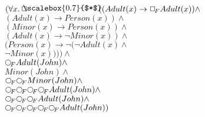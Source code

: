 \documentclass[a4paper,10pt]{article}
\begin{document}
 \newcommand{\nxt}{{\ensuremath\raisebox{0.25ex}{\text{\scriptsize$\bigcirc$}}}}
\newcommand{\Rdiamond}{\Diamond_{\!F}}
\newcommand{\Rbox}{\Box_{\!F}}
\newcommand{\Rnext}{\nxt_{\!F}}
\newcommand{\Ldiamond}{\Diamond_{\!P}}
\newcommand{\Lbox}{\Box_{\!P}}
\newcommand{\Lnext}{\nxt_{\!P}}
\newcommand{\SVdiamond}{\mathop{\ooalign{$\Diamond$ \cr \kern0.5ex
    \raisebox{0.35ex}{\scalebox{0.7}{$*$}}} \kern-0.9ex}}
\newcommand{\SVbox}{\mathop{\ooalign{$\Box$ \cr \kern0.42ex
    \raisebox{0.3ex}{\scalebox{0.7}{$*$}}} \kern-0.9ex}}


$( \forall x.  \SVbox ((Adult(x) \rightarrow  \Rbox Adult(x)) \land $ \\ 
 $ (Adult(x) \rightarrow Person(x)) \land $ \\ 
 $ (Minor(x) \rightarrow Person(x)) \land $ \\ 
 $ (Adult(x) \rightarrow  \lnot Minor(x)) \land $ \\ 
 $ (Person(x) \rightarrow  \lnot ( \lnot Adult(x) \land $ \\ 
 $  \lnot Minor(x)))) \land $ \\ 
 $  \Rnext Adult(John) \land $ \\ 
 $ Minor(John) \land $ \\ 
 $  \Rnext  \Rnext Minor(John) \land $ \\ 
 $  \Rnext  \Rnext  \Rnext  \Rnext Adult(John) \land $ \\ 
 $  \Rnext  \Rnext  \Rnext Adult(John) \land $ \\ 
 $  \Rnext  \Rnext  \Rnext  \Rnext  \Rnext Adult(John))$ 
\end{document}
